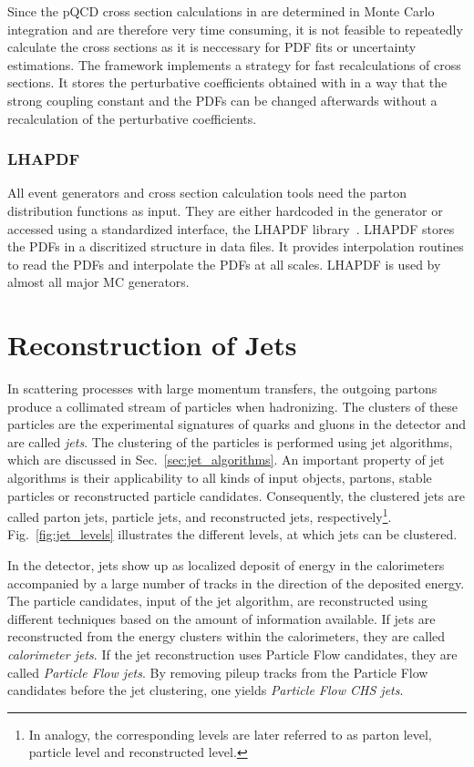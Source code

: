 Since the pQCD cross section calculations in \NLOJETPP are determined in Monte
Carlo integration and are therefore very time consuming, it is not feasible to
repeatedly calculate the cross sections as it is neccessary for PDF fits or
uncertainty estimations. The \fastNLO framework implements a strategy for fast
recalculations of cross sections. It stores the perturbative coefficients
obtained with \NLOJETPP in a way that the strong coupling constant and the PDFs
can be changed afterwards without a recalculation of the perturbative
coefficients.

\subsubsection{LHAPDF}

All event generators and cross section calculation tools need the parton
distribution functions as input. They are either hardcoded in the generator or
accessed using a standardized interface, the LHAPDF
library~\cite{Whalley:2005nh,Buckley:2014ana}. LHAPDF stores the PDFs in a discritized
structure in data files. It provides interpolation routines to read the PDFs and
interpolate the PDFs at all scales. LHAPDF is used by almost all major MC
generators.


\section{Reconstruction of Jets}
\label{sec:jet_reconstruction}

In scattering processes with large momentum transfers, the outgoing partons
produce a collimated stream of particles when hadronizing. The clusters of these
particles are the experimental signatures of quarks and gluons in the detector
and are called \emph{jets}. The clustering of the particles is performed using
jet algorithms, which are discussed in Sec.~\ref{sec:jet_algorithms}. An
important property of jet algorithms is their applicability to all kinds of
input objects, \ie partons, stable particles or reconstructed particle
candidates. Consequently, the clustered jets are called parton jets, particle
jets, and reconstructed jets, respectively\footnote{In analogy, the 
corresponding levels are later referred to as parton level, particle level
and reconstructed level.}. Fig.~\ref{fig:jet_levels} illustrates the different
levels, at which jets can be clustered.

In the \CMS detector, jets show up as localized deposit of energy in the
calorimeters accompanied by a large number of tracks in the direction of the
deposited energy. The particle candidates, input of the jet algorithm,  are
reconstructed using different techniques based on the amount of information
available. If jets are reconstructed from the energy clusters within the
calorimeters, they are called \emph{calorimeter jets}. If the jet reconstruction
uses Particle Flow candidates, they are called \emph{Particle Flow jets}. By
removing pileup tracks from the Particle Flow candidates before the jet
clustering, one yields \emph{Particle Flow CHS jets}. 

